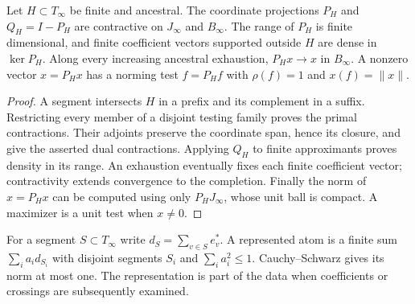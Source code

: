 \begin{lemma}\label{binf:projections}
Let $H\subset T_\infty$ be finite and ancestral. The coordinate
projections $P_H$ and $Q_H=I-P_H$ are contractive on $J_\infty$ and
$B_\infty$. The range of $P_H$ is finite dimensional, and finite
coefficient vectors supported outside $H$ are dense in $\ker P_H$.
Along every increasing ancestral exhaustion, $P_Hx\to x$ in
$B_\infty$. A nonzero vector $x=P_Hx$ has a norming test $f=P_Hf$
with $\rho(f)=1$ and $x(f)=\|x\|$.
\end{lemma}
\begin{proof}
A segment intersects $H$ in a prefix and its complement in a suffix.
Restricting every member of a disjoint testing family proves the primal
contractions. Their adjoints preserve the coordinate span, hence its
closure, and give the asserted dual contractions. Applying $Q_H$ to
finite approximants proves density in its range. An exhaustion eventually
fixes each finite coefficient vector; contractivity extends convergence
to the completion. Finally the norm of $x=P_Hx$ can be computed using
only $P_HJ_\infty$, whose unit ball is compact. A maximizer is a unit
test when $x\ne0$.
\end{proof}

For a segment $S\subset T_\infty$ write $d_S=\sum_{v\in S}e_v^*$.
A represented atom is a finite sum $\sum_i a_i d_{S_i}$ with disjoint
segments $S_i$ and $\sum_i a_i^2\le1$. Cauchy--Schwarz gives its norm
at most one. The representation is part of the data when coefficients
or crossings are subsequently examined.


